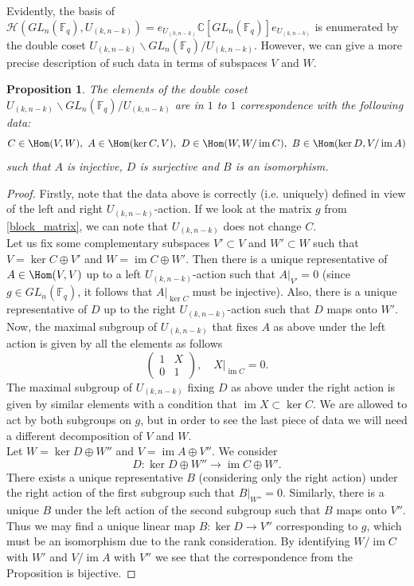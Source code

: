 \documentclass[12pt,reqno]{amsart}
\newtheorem{prop}[thm]{Proposition}
\theoremstyle{definition}
\theoremstyle{remark}
\numberwithin{equation}{section}
\newcommand{\CC}{\mathbb{C}}
\newcommand{\GL}[1]{GL_{#1}(\mathbb{F}_q)}
\DeclareMathOperator{\im}{im}
\begin{document}
Evidently, the basis of $\mathcal{H}(\GL{n},U_{(k,n-k)})=e_{U_{(k,n-k)}}\CC[\GL{n}]e_{U_{(k,n-k)}}$ is enumerated by the double coset $U_{(k,n-k)}\backslash \GL{n}/ U_{(k,n-k)}$. However, we can give a more precise description of such data in terms of subspaces $V$ and $W$.\\

\begin{prop}\label{Hecke_basis_k_n-k}
    The elements of the double coset $U_{(k,n-k)}\backslash \GL{n}/ U_{(k,n-k)}$ are in $1$ to $1$ correspondence with the following data:
    \[
    C\in \Hom(V,W),\ A\in \Hom(\ker C,V),\ D\in \Hom(W,W/\im C),\ B\in \Hom(\ker D, V/\im A)
    \]
    such that $A$ is injective, $D$ is surjective and $B$ is an isomorphism.
\end{prop}

\begin{proof}
    Firstly, note that the data above is correctly (i.e. uniquely) defined in view of the left and right $U_{(k,n-k)}$-action. If we look at the matrix $g$ from \eqref{block_matrix}, we can note that $U_{(k,n-k)}$ does not change $C$.\\

    Let us fix some complementary subspaces $V'\subset V$ and $W'\subset W$ such that $V=\ker C \oplus V'$ and $W=\im C \oplus W'$. Then there is a unique representative of $A\in \Hom(V,V)$ up to a left $U_{(k,n-k)}$-action such that $A|_{V'}=0$ (since $g\in \GL{n}$, it follows that $A|_{\ker C}$ must be injective). Also, there is a unique representative of $D$ up to the right $U_{(k,n-k)}$-action such that $D$ maps onto $W'$.\\

    Now, the maximal subgroup of $U_{(k,n-k)}$ that fixes $A$ as above under the left action is given by all the elements as follows
    \[
    \begin{pmatrix}
    1 & X\\
    0 & 1
\end{pmatrix}, \quad X|_{\im C}=0.
    \]
    The maximal subgroup of $U_{(k,n-k)}$ fixing $D$ as above under the right action is given by similar elements with a condition that $\im X \subset \ker C$. We are allowed to act by both subgroups on $g$, but in order to see the last piece of data we will need a different decomposition of $V$ and $W$.\\

    Let $W=\ker D \oplus W''$ and $V=\im A \oplus V''$. We consider
    \[
    D: \ker D \oplus W'' \rightarrow \im C \oplus W'.
    \]
    There exists a unique representative $B$ (considering only the right action) under the right action of the first subgroup such that $B|_{W''}=0$. Similarly, there is a unique $B$ under the left action of the second subgroup such that $B$ maps onto $V''$.\\

    Thus we may find a unique linear map $B: \ker D \rightarrow V''$ corresponding to $g$, which must be an isomorphism due to the rank consideration. By identifying $W/\im C$ with $W'$ and $V/\im A$ with $V''$ we see that the correspondence from the Proposition is bijective.
\end{proof}
\end{document}
